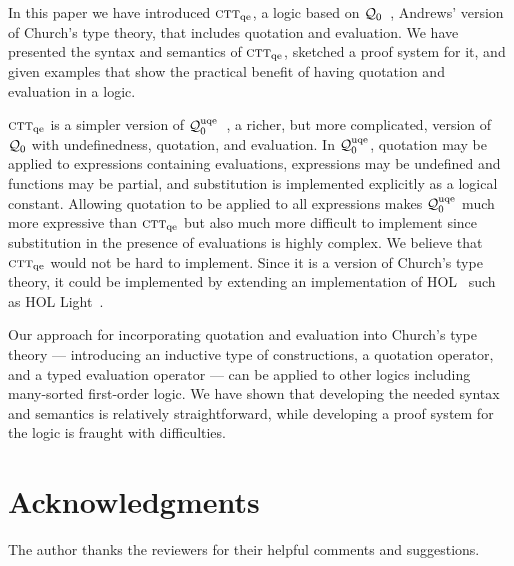 \documentclass[fleqn]{llncs}
\newcommand{\churchqe}{$\mbox{\sc ctt}_{\rm qe}$}
\newcommand{\qzero}{${\cal Q}_0$}
\newcommand{\qzerouqe}{${\cal Q}^{\rm uqe}_{0}$}
\begin{document}
In this paper we have introduced {\churchqe}, a logic based on
{\qzero}~\cite{Andrews02}, Andrews' version of Church's type theory,
that includes quotation and evaluation.  We have presented the syntax
and semantics of {\churchqe}, sketched a proof system for it, and
given examples that show the practical benefit of having quotation and
evaluation in a logic.

{\churchqe} is a simpler version of {\qzerouqe}~\cite{FarmerArxiv14},
a richer, but more complicated, version of {\qzero} with
undefinedness, quotation, and evaluation.  In {\qzerouqe}, quotation
may be applied to expressions containing evaluations, expressions may
be undefined and functions may be partial, and substitution is
implemented explicitly as a logical constant.  Allowing quotation to
be applied to all expressions makes {\qzerouqe} much more expressive
than {\churchqe} but also much more difficult to implement since
substitution in the presence of evaluations is highly complex.  We
believe that {\churchqe} would not be hard to implement.  Since it is
a version of Church's type theory, it could be implemented by
extending an implementation of HOL~\cite{GordonMelham93} such as
HOL Light~\cite{Harrison09}.

Our approach for incorporating quotation and evaluation into Church's
type theory --- introducing an inductive type of constructions, a
quotation operator, and a typed evaluation operator --- can be applied
to other logics including many-sorted first-order logic.  We have
shown that developing the needed syntax and semantics is relatively
straightforward, while developing a proof system for the logic is
fraught with difficulties.

\section*{Acknowledgments}

The author thanks the reviewers for their helpful comments and
suggestions.


\end{document}
